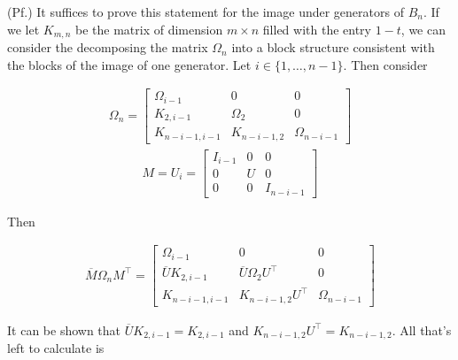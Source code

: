 \documentclass[10pt]{ucthesis}
\begin{document}
\noindent(Pf.) It suffices to prove this statement for the image under generators of $B_n$. If we let $K_{m,n}$ be the matrix of dimension $m\times n$ filled with the entry $1-t$, we can consider the decomposing the matrix $\Omega_n$ into a block structure consistent with the blocks of the image of one generator. Let $i\in\{1,\hdots,n-1\}$. Then consider 

\begin{equation}
	\begin{aligned}
		\Omega_n = \begin{bmatrix}
							\Omega_{i-1} & 0 & 0\\
							K_{2,i-1} & \Omega_2 & 0 \\
							K_{n-i-1,i-1}& K_{n-i-1,2}&\Omega_{n-i-1}
						\end{bmatrix}
	\end{aligned}
\end{equation}
\begin{equation}
	\begin{aligned}
		M = U_i = \begin{bmatrix}
							I_{i-1} & 0 & 0\\
							0 & U & 0 \\
							0& 0&I_{n-i-1}
						\end{bmatrix}
	\end{aligned}
\end{equation}

Then

\begin{equation}
	\begin{aligned}
		\overline{M}\Omega_nM^\intercal = \begin{bmatrix}
														\Omega_{i-1} & 0 & 0\\
														\overline{U}K_{2,i-1} & \overline{U}\Omega_2U^\intercal & 0 \\
														K_{n-i-1,i-1}& K_{n-i-1,2}U^\intercal&\Omega_{n-i-1}
													\end{bmatrix}
	\end{aligned}
\end{equation}

It can be shown that $\overline{U}K_{2,i-1} = K_{2,i-1}$ and $K_{n-i-1,2}U^\intercal=K_{n-i-1,2}$. All that's left to calculate is 
\end{document}
